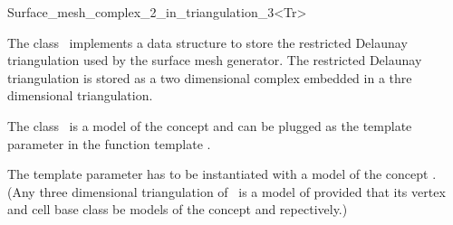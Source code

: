 

\begin{ccRefClass}{Surface_mesh_complex_2_in_triangulation_3<Tr>}  %


\ccDefinition
  
The class \ccRefName\  implements a data structure to store
the restricted Delaunay triangulation used by the surface mesh generator.
The restricted Delaunay triangulation is stored as a two dimensional
complex embedded in a thre dimensional triangulation.


The class  \ccRefName\ is a model of the concept 
and can be plugged as the template parameter 
in the function template .


The template parameter  has to be instantiated
with a model of the concept .
(Any three dimensional   triangulation of
\cgal\ is a model of 
provided that its vertex and cell base class be models
of the concept  and
repectively.)





\ccIsModel











\end{ccRefClass}
